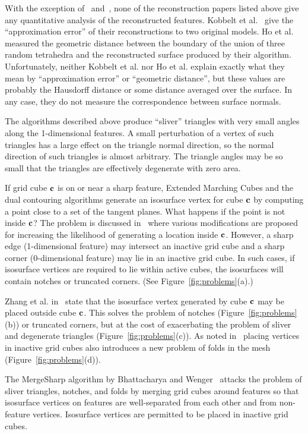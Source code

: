 With the exception of~\cite{kbsh-fssev-01} and~\cite{hwco-cmsaf-05},
none of the reconstruction papers listed above give any quantitative
analysis of the reconstructed features.
Kobbelt et al.~\cite{kbsh-fssev-01} give the ``approximation error''
of their reconstructions to two original models.
Ho et al.~\cite{hwco-cmsaf-05} measured the geometric distance
between the boundary of the union of three random tetrahedra and 
the reconstructed surface produced by their algorithm.
Unfortunately, neither Kobbelt et al. nor Ho et al. explain
exactly what they mean by ``approximation error'' or ``geometric distance'',
but these values are probably the Hausdorff distance 
or some distance averaged over the surface.
In any case, they do not measure the correspondence 
between surface normals.

The algorithms described above 
produce ``sliver'' triangles with very small angles 
along the 1-dimensional features.
A small perturbation of a vertex of such triangles
has a large effect on the triangle normal direction,
so the normal direction of such triangles is almost arbitrary.
The triangle angles may be so small that the triangles are effectively
degenerate with zero area.

If grid cube $\mathbf{c}$ is on or near a sharp feature,
Extended Marching Cubes and the dual contouring algorithms
generate an isosurface vertex for cube $\mathbf{c}$
by computing a point close to a set of the tangent planes.
What happens if the point is not inside $\mathbf{c}$?
The problem is discussed in~\cite{sw-dcss-02}
where various modifications are proposed for increasing the likelihood
of generating a location inside $\mathbf{c}$.
However, a sharp edge (1-dimensional feature) may intersect 
an inactive grid cube  and a sharp corner (0-dimensional feature) 
may lie in an inactive grid cube.
In such cases, if isosurface vertices are required to lie within active cubes,
the isosurfaces will contain notches or truncated corners.
(See Figure~\ref{fig:problems}(a).)

Zhang et al. in~\cite{zhk-dctps-04} state that the isosurface vertex
generated by cube $\mathbf{c}$ may be placed outside cube $\mathbf{c}$.
This solves the problem of notches (Figure~\ref{fig:problems}(b))
or truncated corners,
but at the cost of exacerbating the problem 
of sliver and degenerate triangles (Figure~\ref{fig:problems}(c)).
As noted in~\cite{sw-dcss-02}
placing vertices in inactive grid cubes also introduces a new problem
of folds in the mesh (Figure~\ref{fig:problems}(d)).

The MergeSharp algorithm by Bhattacharya and Wenger~\cite{bw-cisec-13,bw-erm-13}
attacks the problem of sliver triangles, notches, and folds
by merging grid cubes around features
so that isosurface vertices on features are well-separated 
from each other and from non-feature vertices.
Isosurface vertices are permitted to be placed in inactive grid cubes.

